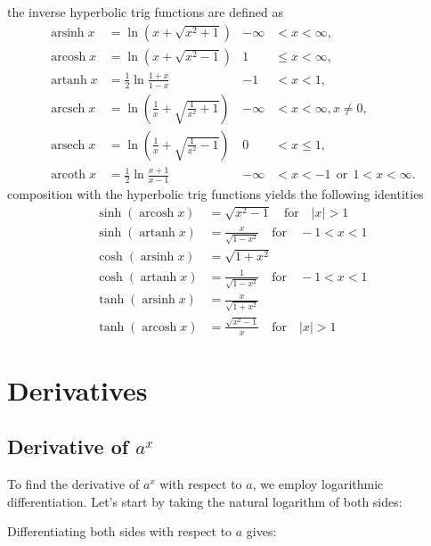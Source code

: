 \documentclass[../../main.tex]{subfiles} %
\begin{document}
the inverse hyperbolic trig functions are defined as
\begin{equation}
    \begin{aligned}
        \operatorname{arsinh} x &= \ln \left(x + \sqrt{x^2 + 1}\right)               & -\infty &< x < \infty, \\
        \operatorname{arcosh} x &= \ln \left(x + \sqrt{x^2 - 1}\right)               & 1 &\leq x < \infty, \\
        \operatorname{artanh} x &= \frac12\ln\frac{1+x}{1-x}                         & -1 &< x < 1, \\
        \operatorname{arcsch} x &= \ln \left(\frac1x + \sqrt{\frac1{x^2} + 1}\right) & -\infty &< x < \infty,  x \neq 0, \\
        \operatorname{arsech} x &= \ln \left(\frac1x + \sqrt{\frac1{x^2} - 1}\right) & 0 &< x \leq 1, \\
        \operatorname{arcoth} x &= \frac12\ln\frac{x+1}{x-1}                         & -\infty &< x < -1 \ \ \text{or} \ \ 1 < x < \infty.
        \end{aligned}
\end{equation}
composition with the hyperbolic trig functions yields the following identities
\begin{equation}\label{eq. hyperbolic trig identities composition}
    \begin{aligned}
        \sinh(\operatorname{arcosh}x) &= \sqrt{x^{2} - 1}  \quad \text{for} \quad |x| > 1 \\
        \sinh(\operatorname{artanh}x) &= \frac{x}{\sqrt{1-x^{2}}} \quad \text{for} \quad -1 < x < 1 \\
        \cosh(\operatorname{arsinh}x) &= \sqrt{1+x^{2}} \\
        \cosh(\operatorname{artanh}x) &= \frac{1}{\sqrt{1-x^{2}}} \quad \text{for} \quad -1 < x < 1 \\
        \tanh(\operatorname{arsinh}x) &= \frac{x}{\sqrt{1+x^{2}}} \\
        \tanh(\operatorname{arcosh}x) &= \frac{\sqrt{x^{2} - 1}}{x} \quad \text{for} \quad |x| > 1
       \end{aligned}
\end{equation}

\section{Derivatives}
\subsection{Derivative of \texorpdfstring{$a^x$}{a\^x}}
To find the derivative of $a^x$ with respect to $a$, we employ logarithmic differentiation. Let's start by taking the natural logarithm of both sides:



Differentiating both sides with respect to $a$ gives:
\end{document}
